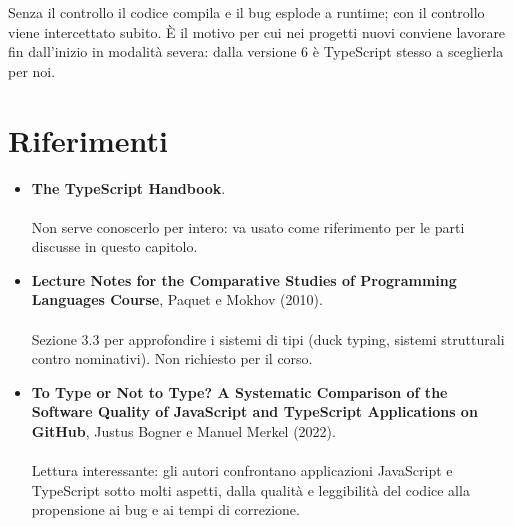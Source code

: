 Senza il controllo il codice compila e il bug esplode a runtime; con il
controllo viene intercettato subito. È il motivo per cui nei progetti nuovi
conviene lavorare fin dall'inizio in modalità severa: dalla versione 6 è
TypeScript stesso a sceglierla per noi.

\section{Riferimenti}

\begin{itemize}
  \item \textbf{The TypeScript Handbook}. \\
         \\
        Non serve conoscerlo per intero: va usato come riferimento per le parti
        discusse in questo capitolo.
  \item \textbf{Lecture Notes for the Comparative Studies of Programming
        Languages Course}, Paquet e Mokhov (2010). \\
         \\
        Sezione 3.3 per approfondire i sistemi di tipi (duck typing, sistemi
        strutturali contro nominativi). Non richiesto per il corso.
  \item \textbf{To Type or Not to Type? A Systematic Comparison of the Software
        Quality of JavaScript and TypeScript Applications on GitHub}, Justus
        Bogner e Manuel Merkel (2022). \\
         \\
        Lettura interessante: gli autori confrontano applicazioni JavaScript e
        TypeScript sotto molti aspetti, dalla qualità e leggibilità del codice
        alla propensione ai bug e ai tempi di correzione.
\end{itemize}
